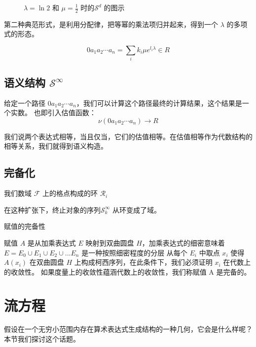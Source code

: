 \documentclass[a4paper,12pt]{article}
\numberwithin{definition}{section}
\numberwithin{lemma}{section}
\numberwithin{proposition}{section}
\numberwithin{theorem}{section}
\numberwithin{grammar}{section}
\numberwithin{program}{section}
\numberwithin{convention}{section}
\numberwithin{corollary}{section}
\begin{document}
\begin{figure}[ht]
{
}
\caption{ $\lambda=\ln2$ 和 $\mu=\frac{1}{2}$ 时的$\mathcal{S}^d$ 的图示}\label{fig:grid0}
\end{figure}

第二种典范形式，是利用分配律，把等幂的乘法项归并起来，得到一个 $\lambda$ 的多项式的形态。

$$
0 a_1 a_2 \cdots a_n = \sum_{i} k_i \mu e^{l_i \lambda} \in R
$$

\subsection{语义结构 $\mathcal{S}^\infty$}\label{subsec:semantical}

给定一个路径 $ 0 a_1 a_2 \cdots a_n $，我们可以计算这个路径最终的计算结果，这个结果是一个实数。
也即引入估值函数：
$$
\nu(0 a_1 a_2 \cdots a_n) \to R
$$

我们说两个表达式相等，当且仅当，它们的估值相等。在估值相等作为代数结构的相等关系，我们就得到语义构造。

\subsection{完备化}\label{subsec:completeness}

我们数域 $\mathcal{F}$ 上的格点构成的环 $\mathcal{R}_i$

在这种扩张下，终止对象的序列$\mathcal{S}^\infty_k$ 从环变成了域。

赋值的完备性

赋值 $A$ 是从加乘表达式 $E$ 映射到双曲圆盘 $H$，加乘表达式的细密意味着 $E = E_0 ∪ E_1 ∪ E_2 ∪ ... E_n$ 是一种按照细密程度的分层
从每个 $E_i$ 中取点 $x_i$ 使得 $A(x_i)$ 在双曲圆盘 $H$ 上构成柯西序列，在此条件下，我们必须证明 $x_i$ 在代数上的收敛性。
如果度量上的收敛性蕴涵代数上的收敛性，我们称赋值 A 是完备的。

\newpage

\section{流方程}

假设在一个无穷小范围内存在算术表达式生成结构的一种几何，它会是什么样呢？本节我们探讨这个话题。
\end{document}
